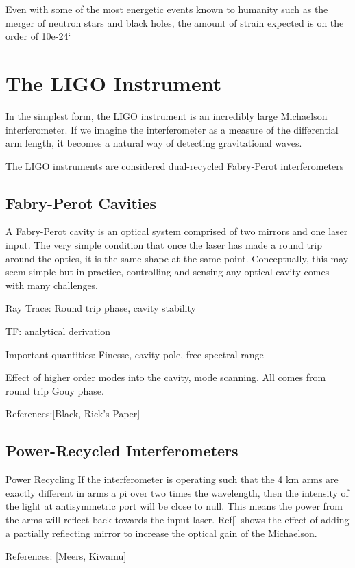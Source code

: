 \documentclass[10pt,a4paper]{book}
\begin{document}
	Even with some of the most energetic events known to humanity such as the merger of neutron stars and black holes, the amount of strain expected is on the order of 10e-24`
	
	
	
	\section{The LIGO Instrument}
	In the simplest form, the LIGO instrument is an incredibly large Michaelson interferometer.  If we imagine the interferometer as a measure of the differential arm length, it becomes a natural way of detecting gravitational waves.
	
	The LIGO instruments are considered dual-recycled Fabry-Perot interferometers
	
		\subsection{Fabry-Perot Cavities}
		A Fabry-Perot cavity is an optical system comprised of two mirrors and one laser input. The very simple condition that once the laser has made a round trip around the optics, it is the same shape at the same point.  Conceptually, this may seem simple but in practice, controlling and sensing any optical cavity comes with many challenges.

		Ray Trace: Round trip phase, cavity stability

		TF: analytical derivation
	
		Important quantities: Finesse, cavity pole, free spectral range
		
		Effect of higher order modes into the cavity, mode scanning. All comes from round trip Gouy phase.

		References:[Black, Rick's Paper]

		\subsection{Power-Recycled Interferometers}
		Power Recycling
		If the interferometer is operating such that the 4 km arms are exactly different in arms a pi over two times the wavelength, then the intensity of the light at antisymmetric port will be close to null.  This means the power from the arms will reflect back towards the input laser.  Ref[] shows the effect of adding a partially reflecting mirror to increase the optical gain of the Michaelson.
		
		References: [Meers, Kiwamu]
		
\end{document}
